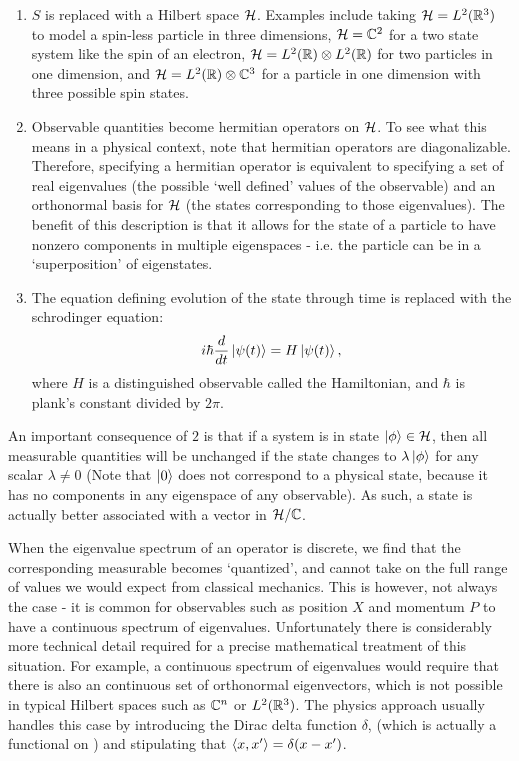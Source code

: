 \documentclass[a4paper]{article}
\begin{document}
\begin{enumerate}
    \item $S$ is replaced with a Hilbert space $\mathcal{H}$. Examples include taking $\mathcal{H} = L^2(\mathbb{R}^3)$ to model a spin-less particle in three dimensions, $\mathcal{H} = \mathbb{C}^2$ for a two state system like the spin of an electron, $\mathcal{H} = L^2(\mathbb{R}) \otimes L^2(\mathbb{R})$ for two particles in one dimension, and $\mathcal{H} = L^2(\mathbb{R}) \otimes \mathbb{C}^3$ for a particle in one dimension with three possible spin states.
    \item Observable quantities become hermitian operators on $\mathcal{H}$. To see what this means in a physical context, note that hermitian operators are diagonalizable. Therefore, specifying a hermitian operator is equivalent to specifying a set of real eigenvalues (the possible `well defined' values of the observable) and an orthonormal basis for $\mathcal{H}$ (the states corresponding to those eigenvalues). The benefit of this  description is that it allows for the state of a particle to have nonzero components in multiple eigenspaces - i.e. the particle can be in a `superposition' of eigenstates. 
    \item The equation defining evolution of the state through time is replaced with the schrodinger equation: 
    $$i\hbar\frac{d}{dt}\left\lvert \psi(t) \right\rangle = H\left\lvert \psi(t) \right\rangle,$$
    where $H$ is a distinguished observable called the Hamiltonian, and $\hbar$ is plank's constant divided by $2 \pi$.
\end{enumerate}

An important consequence of $2$ is that if a system is in state $\left\lvert \phi \right\rangle \in \mathcal{H}$, then all measurable quantities will be unchanged if the state changes to $\lambda\left\lvert \phi \right\rangle$ for any scalar $\lambda \neq 0$ (Note that $\left\lvert 0 \right\rangle$ does not correspond to a physical state, because it has no components in any eigenspace of any observable). As such, a state is actually better associated with a vector in $\mathcal{H} / \mathbb{C}$.

When the eigenvalue spectrum of an operator is discrete, we find that the corresponding measurable becomes `quantized', and cannot take on the full range of values we would expect from classical mechanics. This is however, not always the case - it is common for observables such as position $X$ and momentum $P$ to have a continuous spectrum of eigenvalues. Unfortunately there is considerably more technical detail required for a precise mathematical treatment of this situation. For example, a continuous spectrum of eigenvalues would require that there is also an continuous set of orthonormal eigenvectors, which is not possible in typical Hilbert spaces such as $\mathbb{C}^n$ or $L^2(\mathbb{R}^3)$. The physics approach usually handles this case by introducing the Dirac delta function $\delta$, (which is actually a functional on ) and stipulating that $\left\langle x , x' \right\rangle = \delta(x-x')$.
\end{document}
